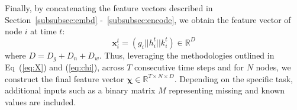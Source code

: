 Finally, by concatenating the feature vectors described in Section~\ref{subsubsec:embd} -~\ref{subsubsec:encode}, we obtain the feature vector of node $i$ at time $t$:
\[
\mathbf{x}_i^t = ( g_i || h_i^t || k_i^t ) \in \mathbb{R}^D
\]
where $D = D_g + D_n + D_w$. Thus, leveraging the methodologies outlined in Eq~(\ref{eq:X}) and (\ref{eq:chi}), across $T$ consecutive time steps and for $N$ nodes, we construct the final feature vector $\mathbf{\chi} \in \mathbb{R}^{T \times N \times D}$. Depending on the specific task, additional inputs such as a binary matrix $M$ representing missing and known values are included. %
